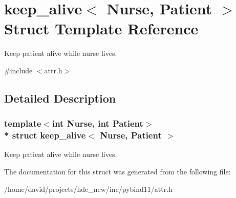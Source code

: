 \hypertarget{structkeep__alive}{}\section{keep\+\_\+alive$<$ Nurse, Patient $>$ Struct Template Reference}
\label{structkeep__alive}


Keep patient alive while nurse lives.  




{\ttfamily \#include $<$attr.\+h$>$}



\subsection{Detailed Description}
\subsubsection*{template$<$int Nurse, int Patient$>$\\*
struct keep\+\_\+alive$<$ Nurse, Patient $>$}

Keep patient alive while nurse lives. 

The documentation for this struct was generated from the following file\+:\begin{DoxyCompactItemize}
\item 
/home/david/projects/hdc\+\_\+new/inc/pybind11/attr.\+h\end{DoxyCompactItemize}
